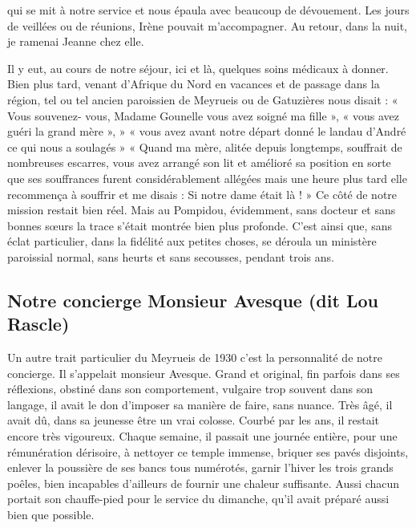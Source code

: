 
qui se mit à notre service et nous épaula avec beaucoup de dévouement. Les jours de
veillées ou de réunions, Irène pouvait m’accompagner. Au retour, dans la nuit, je
ramenai Jeanne chez elle.

Il y eut, au cours de notre séjour, ici et là, quelques soins médicaux à donner. Bien
plus tard, venant d’Afrique du Nord en vacances et de passage dans la région, tel ou
tel ancien paroissien de Meyrueis ou de Gatuzières nous disait : « Vous souvenez-
vous, Madame Gounelle vous avez soigné ma fille », « vous avez guéri la grand
mère », » « vous avez avant notre départ donné le landau d’André ce qui nous a
soulagés » « Quand ma mère, alitée depuis longtemps, souffrait de nombreuses
escarres, vous avez arrangé son lit et amélioré sa position en sorte que ses
souffrances furent considérablement allégées mais une heure plus tard elle
recommença à souffrir et me disais : Si notre dame était là ! »
Ce côté de notre mission restait bien réel. Mais au Pompidou, évidemment, sans
docteur et sans bonnes sœurs la trace s’était montrée bien plus profonde.
C’est ainsi que, sans éclat particulier, dans la fidélité aux petites choses, se déroula un
ministère paroissial normal, sans heurts et sans secousses, pendant trois ans.

\subsection*{Notre concierge Monsieur Avesque (dit Lou Rascle)}

Un autre trait particulier du Meyrueis de 1930 c’est la personnalité de notre
concierge. Il s’appelait monsieur Avesque. Grand et original, fin parfois dans ses
réflexions, obstiné dans son comportement, vulgaire trop souvent dans son langage, il
avait le don d’imposer sa manière de faire, sans nuance. Très âgé, il avait dû, dans sa
jeunesse être un vrai colosse. Courbé par les ans, il restait encore très vigoureux.
Chaque semaine, il passait une journée entière, pour une rémunération dérisoire, à
nettoyer ce temple immense, briquer ses pavés disjoints, enlever la poussière de ses
bancs tous numérotés, garnir l’hiver les trois grands poêles, bien incapables d’ailleurs
de fournir une chaleur suffisante. Aussi chacun portait son chauffe-pied pour le
service du dimanche, qu’il avait préparé aussi bien que possible.

